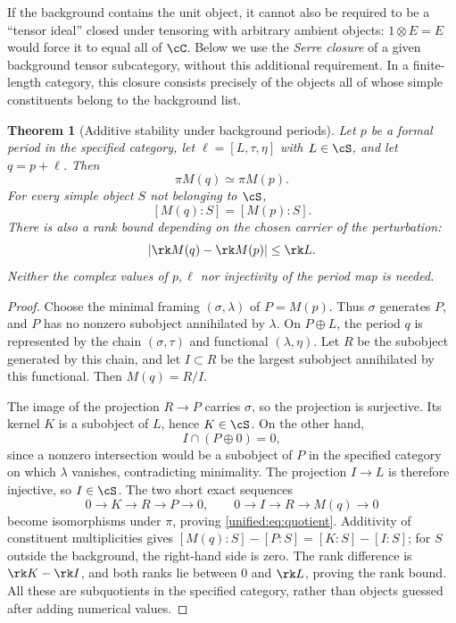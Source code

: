 \documentclass[11pt,a4paper,oneside]{article}
\theoremstyle{plain}
\newtheorem{theorem}{Theorem}[section]
\theoremstyle{definition}
\theoremstyle{remark}
\numberwithin{equation}{section}
\begin{document}
If the background contains the unit object, it cannot also be required to be a
``tensor ideal'' closed under tensoring with arbitrary ambient objects: $1\otimes E=E$ would force it to equal all of $\cC$.
Below we use the \emph{Serre closure} of a given background tensor subcategory, without this additional requirement.
In a finite-length category, this closure consists precisely of the objects all of whose simple constituents belong to the background list.

\begin{theorem}[Additive stability under background periods]\label{unified:thm:addition}
Let $p$ be a formal period in the specified category, let $\ell=[L,\tau,\eta]$ with $L\in\cS$,
and let $q=p+\ell$. Then
\begin{equation}\label{unified:eq:quotient}
 \pi M(q)\simeq\pi M(p).
\end{equation}
For every simple object $S$ not belonging to $\cS$,
\[
 [M(q):S]=[M(p):S].
\]
There is also a rank bound depending on the chosen carrier of the perturbation:
\[
 |\rk M(q)-\rk M(p)|\leq\rk L .
\]
Neither the complex values of $p,\ell$ nor injectivity of the period map is needed.
\end{theorem}
\begin{proof}
Choose the minimal framing $(\sigma,\lambda)$ of $P=M(p)$.
Thus $\sigma$ generates $P$, and $P$ has no nonzero subobject annihilated by $\lambda$.
On $P\oplus L$, the period $q$ is represented by the chain $(\sigma,\tau)$ and functional $(\lambda,\eta)$.
Let $R$ be the subobject generated by this chain, and let $I\subset R$ be the largest subobject annihilated by this functional.
Then $M(q)=R/I$.

The image of the projection $R\to P$ carries $\sigma$, so the projection is surjective. Its kernel $K$ is a subobject of $L$,
hence $K\in\cS$. On the other hand,
\[
 I\cap(P\oplus0)=0,
\]
since a nonzero intersection would be a subobject of $P$ in the specified category on which $\lambda$ vanishes, contradicting minimality.
The projection $I\to L$ is therefore injective, so $I\in\cS$. The two short exact sequences
\[
 0\to K\to R\to P\to0,\qquad
 0\to I\to R\to M(q)\to0
\]
become isomorphisms under $\pi$, proving \eqref{unified:eq:quotient}.
Additivity of constituent multiplicities gives
$[M(q):S]-[P:S]=[K:S]-[I:S]$;
for $S$ outside the background, the right-hand side is zero.
The rank difference is $\rk K-\rk I$, and both ranks lie between $0$ and $\rk L$, proving the rank bound.
All these are subquotients in the specified category, rather than objects guessed after adding numerical values.
\end{proof}
\end{document}
